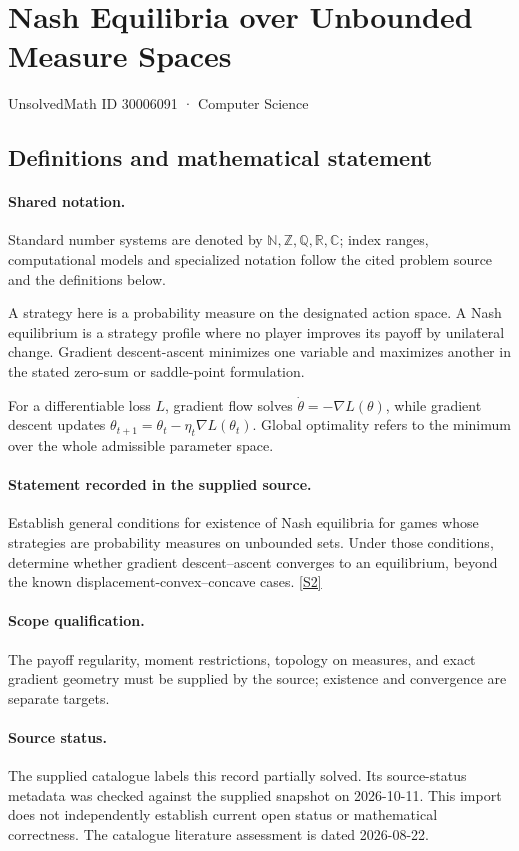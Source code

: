\documentclass[11pt]{article}
\newcommand{\sref}[2]{\hyperlink{source:#1:#2}{[S#2]}}
\begin{document}
\setcounter{section}{30006090}
\section{Nash Equilibria over Unbounded Measure Spaces}\label{30006091}
{\small\sffamily UnsolvedMath ID 30006091 · Computer Science}
\subsection{Definitions and mathematical statement}

\paragraph{Shared notation.}Standard number systems are denoted by $\mathbb N,\mathbb Z,\mathbb Q,\mathbb R,\mathbb C$; index ranges, computational models and specialized notation follow the cited problem source and the definitions below.


A strategy here is a probability measure on the designated action space. A Nash equilibrium is a strategy profile where no player improves its payoff by unilateral change. Gradient descent-ascent minimizes one variable and maximizes another in the stated zero-sum or saddle-point formulation.

For a differentiable loss $L$, gradient flow solves $\dot\theta=-\nabla L(\theta)$, while gradient descent updates $\theta_{t+1}=\theta_t-\eta_t\nabla L(\theta_t)$. Global optimality refers to the minimum over the whole admissible parameter space.
\paragraph{Statement recorded in the supplied source.}
Establish general conditions for existence of Nash equilibria for games whose strategies are probability measures on unbounded sets. Under those conditions, determine whether gradient descent–ascent converges to an equilibrium, beyond the known displacement-convex–concave cases. \sref{30006091}{2}
\paragraph{Scope qualification.}
The payoff regularity, moment restrictions, topology on measures, and exact gradient geometry must be supplied by the source; existence and convergence are separate targets.
\paragraph{Source status.}
The supplied catalogue labels this record partially solved. Its source-status metadata was checked against the supplied snapshot on 2026-10-11. This import does not independently establish current open status or mathematical correctness. The catalogue literature assessment is dated 2026-08-22.
\end{document}

